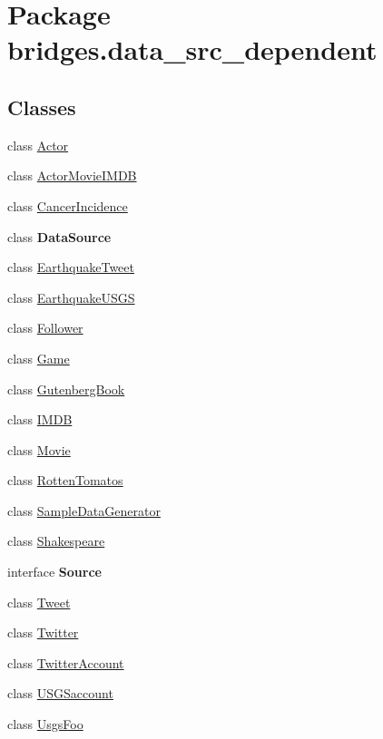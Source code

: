 \hypertarget{namespacebridges_1_1data__src__dependent}{}\section{Package bridges.\+data\+\_\+src\+\_\+dependent}
\label{namespacebridges_1_1data__src__dependent}
\subsection*{Classes}
\begin{DoxyCompactItemize}
\item 
class \mbox{\hyperlink{classbridges_1_1data__src__dependent_1_1_actor}{Actor}}
\item 
class \mbox{\hyperlink{classbridges_1_1data__src__dependent_1_1_actor_movie_i_m_d_b}{Actor\+Movie\+I\+M\+DB}}
\item 
class \mbox{\hyperlink{classbridges_1_1data__src__dependent_1_1_cancer_incidence}{Cancer\+Incidence}}
\item 
class {\bfseries Data\+Source}
\item 
class \mbox{\hyperlink{classbridges_1_1data__src__dependent_1_1_earthquake_tweet}{Earthquake\+Tweet}}
\item 
class \mbox{\hyperlink{classbridges_1_1data__src__dependent_1_1_earthquake_u_s_g_s}{Earthquake\+U\+S\+GS}}
\item 
class \mbox{\hyperlink{classbridges_1_1data__src__dependent_1_1_follower}{Follower}}
\item 
class \mbox{\hyperlink{classbridges_1_1data__src__dependent_1_1_game}{Game}}
\item 
class \mbox{\hyperlink{classbridges_1_1data__src__dependent_1_1_gutenberg_book}{Gutenberg\+Book}}
\item 
class \mbox{\hyperlink{classbridges_1_1data__src__dependent_1_1_i_m_d_b}{I\+M\+DB}}
\item 
class \mbox{\hyperlink{classbridges_1_1data__src__dependent_1_1_movie}{Movie}}
\item 
class \mbox{\hyperlink{classbridges_1_1data__src__dependent_1_1_rotten_tomatos}{Rotten\+Tomatos}}
\item 
class \mbox{\hyperlink{classbridges_1_1data__src__dependent_1_1_sample_data_generator}{Sample\+Data\+Generator}}
\item 
class \mbox{\hyperlink{classbridges_1_1data__src__dependent_1_1_shakespeare}{Shakespeare}}
\item 
interface {\bfseries Source}
\item 
class \mbox{\hyperlink{classbridges_1_1data__src__dependent_1_1_tweet}{Tweet}}
\item 
class \mbox{\hyperlink{classbridges_1_1data__src__dependent_1_1_twitter}{Twitter}}
\item 
class \mbox{\hyperlink{classbridges_1_1data__src__dependent_1_1_twitter_account}{Twitter\+Account}}
\item 
class \mbox{\hyperlink{classbridges_1_1data__src__dependent_1_1_u_s_g_saccount}{U\+S\+G\+Saccount}}
\item 
class \mbox{\hyperlink{classbridges_1_1data__src__dependent_1_1_usgs_foo}{Usgs\+Foo}}
\end{DoxyCompactItemize}

